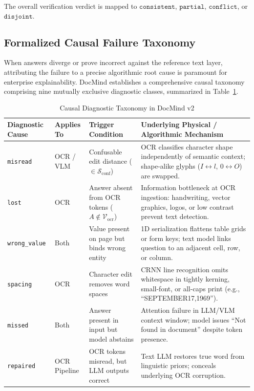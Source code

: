 \documentclass[conference]{IEEEtran}
\begin{document}
The overall verification verdict is mapped to $\texttt{consistent}$, $\texttt{partial}$, $\texttt{conflict}$, or $\texttt{disjoint}$.

\subsection{Formalized Causal Failure Taxonomy}
When answers diverge or prove incorrect against the reference text layer, attributing the failure to a precise algorithmic root cause is paramount for enterprise explainability. DocMind establishes a comprehensive causal taxonomy comprising nine mutually exclusive diagnostic classes, summarized in Table~\ref{tab:taxonomy}.

\begin{table}[!t]
\caption{Causal Diagnostic Taxonomy in DocMind v2}
\label{tab:taxonomy}
\begin{center}
\begin{tabular}{lllp{8.5cm}}
\toprule
\textbf{Diagnostic Cause} & \textbf{Applies To} & \textbf{Trigger Condition} & \textbf{Underlying Physical / Algorithmic Mechanism} \\
\midrule
\texttt{misread} & OCR / VLM & Confusable edit distance ($\in \mathcal{S}_{\text{conf}}$) & OCR classifies character shape independently of semantic context; shape-alike glyphs ($I \leftrightarrow l$, $0 \leftrightarrow O$) are swapped. \\
\texttt{lost} & OCR & Answer absent from OCR tokens ($A \notin \mathcal{V}_{\text{ocr}}$) & Information bottleneck at OCR ingestion: handwriting, vector graphics, logos, or low contrast prevent text detection. \\
\texttt{wrong\_value} & Both & Value present on page but binds wrong entity & 1D serialization flattens table grids or form keys; text model links question to an adjacent cell, row, or column. \\
\texttt{spacing} & OCR & Character edit removes word spaces & CRNN line recognition omits whitespace in tightly kerning, small-font, or all-caps print (e.g., ``SEPTEMBER17,1969''). \\
\texttt{missed} & Both & Answer present in input but model abstains & Attention failure in LLM/VLM context window; model issues ``Not found in document'' despite token presence. \\
\texttt{repaired} & OCR Pipeline & OCR tokens misread, but LLM outputs correct & Text LLM restores true word from linguistic priors; conceals underlying OCR corruption. \\

\end{tabular}
\end{center}
\end{table}
\end{document}
